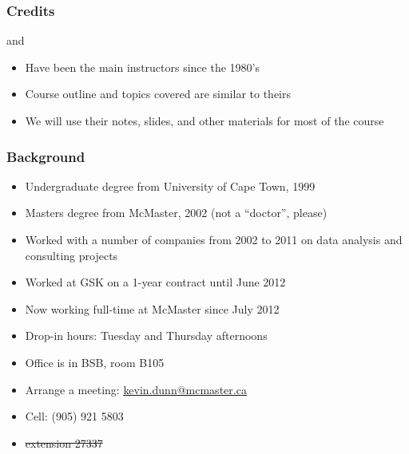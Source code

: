

\begin{frame}\frametitle{Credits}	
	\begin{exampleblock}{}
		\centering {\color{myOrange}{Dr. Don Woods}} and {\color{myBlue}{Dr. Thomas Marlin}}
	\end{exampleblock}
	\begin{itemize}		
		\item	Have been the main instructors since the 1980's
		\item	Course outline and topics covered are similar to theirs
		\item	We will use their notes, slides, and other materials for most of the course
	\end{itemize}	
\end{frame}

\begin{frame}\frametitle{Background}
	{\color{myGreen}{About myself}}
	\begin{itemize}
		\item	Undergraduate degree from University of Cape Town, 1999
		\item	Masters degree from McMaster, 2002 (not a ``doctor'', please)
		\item	Worked with a number of companies from 2002 to 2011 on data analysis and consulting projects
		\item	Worked at GSK on a 1-year contract until June 2012		
		\item	Now working full-time at McMaster since July 2012
		\item	Drop-in hours: Tuesday and Thursday afternoons
		\item	Office is in BSB, room B105
		\item	Arrange a meeting: \url{kevin.dunn@mcmaster.ca}
		\item	Cell: (905) 921 5803
		\item	\sout{extension 27337}
	\end{itemize}	
\end{frame}

